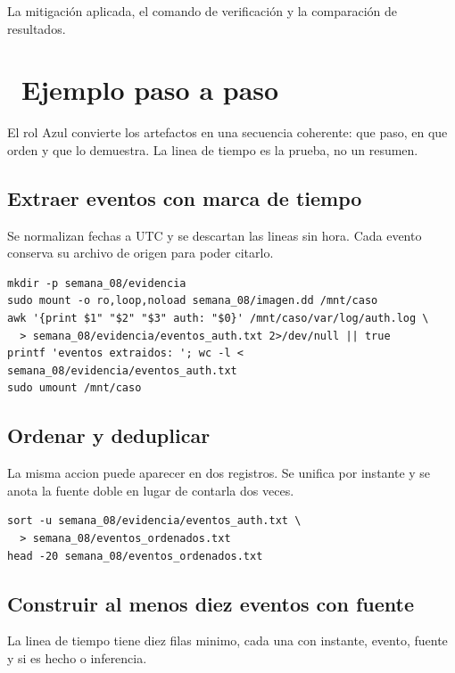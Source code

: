 \documentclass[11pt,a4paper]{article}
\newcommand{\iconotexto}[2]{\textcolor{cyanNeon}{\faIcon{#1}}~#2}
\begin{document}
La mitigación aplicada, el comando de verificación y la comparación de resultados.

\section{\iconotexto{list-ol}{Ejemplo paso a paso}}

El rol Azul convierte los artefactos en una secuencia coherente: que paso, en que orden y que lo demuestra. La linea de tiempo es la prueba, no un resumen.

\subsection{Extraer eventos con marca de tiempo}

Se normalizan fechas a UTC y se descartan las lineas sin hora. Cada evento conserva su archivo de origen para poder citarlo.

\begin{lstlisting}[style=estiloCodigo]
mkdir -p semana_08/evidencia
sudo mount -o ro,loop,noload semana_08/imagen.dd /mnt/caso
awk '{print $1" "$2" "$3" auth: "$0}' /mnt/caso/var/log/auth.log \
  > semana_08/evidencia/eventos_auth.txt 2>/dev/null || true
printf 'eventos extraidos: '; wc -l < semana_08/evidencia/eventos_auth.txt
sudo umount /mnt/caso
\end{lstlisting}

\subsection{Ordenar y deduplicar}

La misma accion puede aparecer en dos registros. Se unifica por instante y se anota la fuente doble en lugar de contarla dos veces.

\begin{lstlisting}[style=estiloCodigo]
sort -u semana_08/evidencia/eventos_auth.txt \
  > semana_08/eventos_ordenados.txt
head -20 semana_08/eventos_ordenados.txt
\end{lstlisting}

\subsection{Construir al menos diez eventos con fuente}

La linea de tiempo tiene diez filas minimo, cada una con instante, evento, fuente y si es hecho o inferencia.
\end{document}
